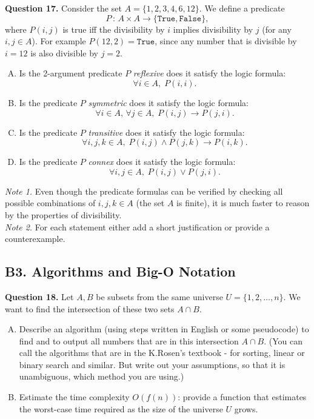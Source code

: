 \documentclass[jou]{apa6}
\begin{document}
\vspace{6pt}
{\bf Question 17.} 
Consider the set $A = \{ 1,2,3,4,6,12 \}$. We define a
predicate 
$$P \,:\, A \times A \rightarrow \{ \mathtt{True}, \mathtt{False} \},$$
where $P(i,j)$ is true iff the divisibility by $i$ implies 
divisibility by $j$ (for any $i,j \in A$). 
For example $P(12,2) = \mathtt{True}$, since any number 
that is divisible by $i = 12$ is also divisible by $j=2$. 

\begin{enumerate}[(A)]
\item Is the 2-argument predicate $P$ {\em reflexive} \textendash{}
does it satisfy the logic formula:
$$\forall i \in A,\;P(i,i).$$
\item Is the predicate $P$ {\em symmetric} \textendash{}
does it satisfy the logic formula:
$$\forall i \in A,\,\forall j \in A,\;P(i,j) \rightarrow P(j,i).$$
\item Is the predicate $P$ {\em transitive} \textendash{}
does it satisfy the logic formula:
$$\forall i,j,k \in A,\;P(i,j) \wedge P(j,k) \rightarrow P(i,k).$$
\item Is the predicate $P$ {\em connex} \textendash{}
does it satisfy the logic formula:
$$\forall i,j \in A,\;P(i,j) \vee P(j,i).$$
\end{enumerate}

{\em Note 1.} Even though the predicate formulas can be verified
by checking all possible combinations of $i,j,k \in A$ (the set $A$ is finite), 
it is much faster to reason by the properties of divisibility.\\
{\em Note 2.} For each statement either add a short justification or provide
a counterexample.






\subsection{B3. Algorithms and Big-O Notation} 

{\bf Question 18.} Let $A,B$ be subsets from the same universe $U = \{ 1,2,\ldots,n \}$. 
We want to find the intersection of these two sets $A \cap B$. 

\begin{enumerate}[(A)]
\item Describe an algorithm (using steps written in English or some pseudocode) 
to find and to output all numbers that are in this intersection $A \cap B$. 
(You can call the algorithms that are in the K.Rosen's textbook - for sorting, 
linear or binary search and similar. But write out your assumptions, so that it is unambiguous, 
which method you are using.)
\item Estimate the time complexity $O(f(n))$: provide a function that estimates the 
worst-case time required as the size of the universe $U$ grows.
\end{enumerate}
\end{document}
